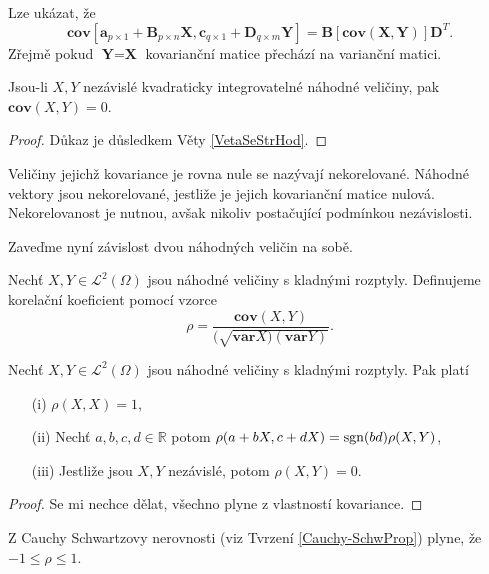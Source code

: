 \begin{remark}
Lze ukázat, že 
\begin{equation}
\mathbf{cov}[\textbf{a}_{p \times 1} + \textbf{B}_{p \times n}\textbf{X}, \textbf{c}_{q \times 1} + \textbf{D}_{q \times m}\textbf{Y}] = \textbf{B}[\mathbf{cov}(\textbf{X}, \textbf{Y})]\textbf{D}^{T}.
\end{equation}
Zřejmě pokud $\textbf{Y} = \textbf{X}$ kovarianční matice přechází na varianční matici.
\end{remark}

\begin{proposition}
Jsou-li $X, Y$ nezávislé kvadraticky integrovatelné náhodné veličiny, pak $\mathbf{cov}(X, Y) = 0$. 
\end{proposition}
\begin{proof}
Důkaz je důsledkem Věty \ref{VetaSeStrHod}.
\end{proof}
Veličiny jejichž kovariance je rovna nule se nazývají nekorelované. Náhodné vektory jsou nekorelované, jestliže je jejich kovarianční matice nulová. Nekorelovanost je nutnou, avšak nikoliv postačující podmínkou nezávislosti.

Zaveďme nyní závislost dvou náhodných veličin na sobě.
\begin{definition}
Nechť $X, Y \in \mathcal{L}^{2}(\Omega)$ jsou náhodné veličiny s kladnými rozptyly. Definujeme korelační koeficient pomocí vzorce
\begin{equation}
\rho =  \frac{\mathbf{cov}(X,Y)}{(\sqrt{\mathbf{var}X) (\mathbf{var}Y)}}.
\end{equation}
\end{definition}

\begin{proposition}
Nechť $X, Y \in \mathcal{L}^{2}(\Omega)$ jsou náhodné veličiny s kladnými rozptyly. Pak platí
\begin{itemize}
\item[(i)] $\rho(X, X) = 1$,
\item[(ii)] Nechť $a, b, c, d \in \mathbb{R}$ potom $\rho(a + bX, c + dX) = \textup{sgn}(bd)\rho(X, Y)$,
\item[(iii)] Jestliže jsou $X, Y$ nezávislé, potom $\rho(X, Y) = 0$.
\end{itemize}
\end{proposition}
\begin{proof}
Se mi nechce dělat, všechno plyne z vlastností kovariance.
\end{proof}
\begin{remark}
Z Cauchy Schwartzovy nerovnosti (viz Tvrzení \ref{Cauchy-SchwProp}) plyne, že $-1 \leq \rho \leq 1$.
\end{remark}

